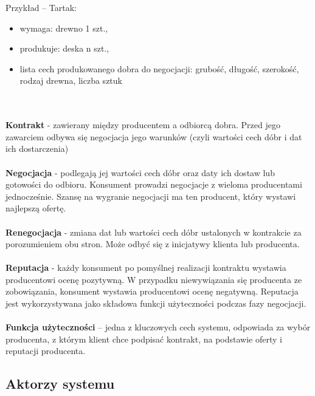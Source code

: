 \documentclass[a4paper,12pt]{article}
\begin{document}
Przykład – Tartak:
\begin{itemize}
\item wymaga: drewno 1 szt.,
\item produkuje: deska n szt.,
\item lista cech produkowanego dobra do negocjacji: grubość, długość, szerokość, rodzaj drewna, liczba sztuk
\end{itemize}
\\ \\
\textbf{Kontrakt} - zawierany między producentem a odbiorcą dobra. Przed jego zawarciem odbywa się negocjacja jego warunków (czyli wartości cech dóbr i dat ich dostarczenia)
\\ \\
\textbf{Negocjacja} - podlegają jej wartości cech dóbr oraz daty ich dostaw lub gotowości do odbioru. Konsument prowadzi negocjacje z wieloma producentami jednocześnie. Szansę na wygranie negocjacji ma ten producent, który wystawi najlepszą ofertę.
\\ \\
\textbf{Renegocjacja} - zmiana dat lub wartości cech dóbr ustalonych w kontrakcie za porozumieniem obu stron. Może odbyć się z inicjatywy klienta lub producenta.
\\ \\
\textbf{Reputacja} - każdy konsument po pomyślnej realizacji kontraktu wystawia producentowi ocenę pozytywną. W przypadku niewywiązania się producenta ze zobowiązania, konsument wystawia producentowi ocenę negatywną. Reputacja jest wykorzystywana jako składowa funkcji użyteczności podczas fazy negocjacji.
\\ \\
\textbf{Funkcja użyteczności} – jedna z kluczowych cech systemu, odpowiada za wybór producenta, z którym klient chce podpisać kontrakt, na podstawie oferty i reputacji producenta.

\newpage

\subsection{Aktorzy systemu}
\end{document}
